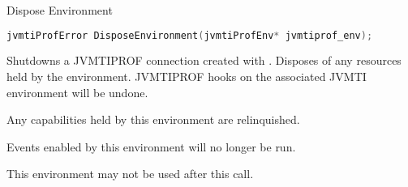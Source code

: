\begin{apidef}{Dispose Environment}
\begin{lstlisting}[language=C]
jvmtiProfError DisposeEnvironment(jvmtiProfEnv* jvmtiprof_env);
\end{lstlisting}

\begin{apidesc}
Shutdowns a JVMTIPROF connection created with . Disposes of any resources held by the environment. JVMTIPROF hooks on the associated JVMTI environment will be undone.

Any capabilities held by this environment are relinquished.

Events enabled by this environment will no longer be run. %

This environment may not be used after this call.

\end{apidesc}

\begin{apiphase}
\apiphaseany %
\end{apiphase}

\begin{apicap}
\apicaprequired
\end{apicap}

\apiparamempty

\apireturnempty

\apierrorempty
\end{apidef}
